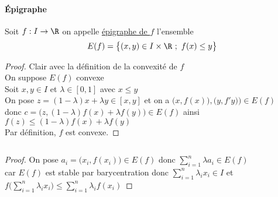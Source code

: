 {    \paragraph{Épigraphe}
        Soit $f:I\rightarrow \R$ on appelle \underline{épigraphe de $f$} l'ensemble \[E(f)=\big\{(x,y)\in I\times\R ~;~f(x)\leq y\big\}\]\trait
    \begin{proof}
    \fbox{$\Rightarrow$} Clair avec la définition de la convexité de $f$ \\
    \fbox{$\Leftarrow$} On suppose $E(f)$ convexe \\ Soit $x,y\in I$ et $\lambda\in [0,1] $ avec $x\leq y$ 
    \\On pose $z=(1-\lambda )x + \lambda y \in [x,y]$ et on a $\big( x,f(x)\big) , \big( y,f'y) \big) \in E(f)$ 
    \\ donc $c=\big( z,(1-\lambda )f(x) + \lambda f(y) \big) \in E(f) $ ainsi $ f(z) \leq (1-\lambda )f(x) + \lambda f(y) $ \\ Par 
    définition, $f$ est convexe. \end{proof}
    ${}$ \\ 
    \begin{proof}
    On pose $a_i = \big( x_i ,f(x_i) \big) \in E(f)$ donc $\sum_{i=1}^n \lambda a_i \in E(f)$ \\car $E(f)$ est stable par barycentration 
    donc $\sum_{i=1}^n \lambda_i x_i \in I$ et $f\big( \sum_{i=1}^n \lambda_i x_i \big) \leq \sum_{i=1}^n \lambda_i f(x_i)$
    \end{proof}
    ${}$\\ 
    \vspace*{0.5cm} \\ }

